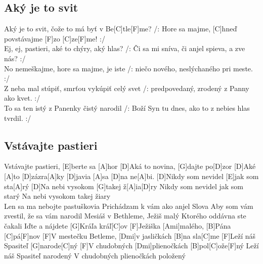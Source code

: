 \documentclass[10pt]{article}
\begin{document}
\begin{Large}
\begin{minipage}{\textwidth}
\subsection{Aký je to svit}
\begin{guitar}
	[F]Aký je to svit, čože to má byť v Be[C]tle[F]me?
	/: Hore sa majme, [C]hneď povstávajme [F]zo [C]ze[F]me! :/
	\\
	Ej, ej, pastieri, aké to chýry, aký hlas?
	/: Či sa mi sníva, či anjel spieva, a zve nás? :/
	\\
	No nemeškajme, hore sa majme, je iste
	/: niečo nového, neslýchaného pri meste. :/
	\\
	Z neba mal stúpiť, smrťou vykúpiť celý svet
	/: predpovedaný, zrodený z Panny ako kvet. :/
	\\
	To sa ten istý z Panenky čistý narodil
	/: Boží Syn tu dnes, ako to z nebies hlas tvrdil. :/
\end{guitar}
\end{minipage}

\begin{minipage}{\textwidth}
\subsection{Vstávajte pastieri}
\begin{multicols}{2}
\begin{guitar}
	[D]Vstávajte pastieri, [E]berte sa [A]hor
	[D]Aká to novina, [G]dajte po[D]zor
	[D]Aké [A]to [D]zázra[A]ky [D]javia [A]sa [D]na ne[A]bi.
	[D]Nikdy som nevidel [E]jak som sta[A]rý
	[D]Na nebi vysokom [G]takej ž[A]ia[D]ry
	Nikdy som nevidel jak som starý
	Na nebi vysokom takej žiary
	\\
	Len sa ma nebojte pastuškovia
	Prichádzam k vám ako anjel Slova
	Aby som vám zvestil, že sa vám narodil
	Mesiáš v Bethleme, Ježiš malý
	Ktorého oddávna ste čakali
	\columnbreak
	[F]Iďte a nájdete [G]Kráľa kráľ[C]ov
	[F]Ježiška [Ami]malého, [B]Pána [C]pá[F]nov
	[F]V mestečku Betleme, [Dmi]v jasličkách [B]na sla[C]me
	[F]Leží náš Spasiteľ [G]narode[C]ný
	[F]V chudobných [Dmi]plienočkách [B]pol[C]ože[F]ný
	Leží náš Spasiteľ narodený
	V chudobných plienočkách položený
\end{guitar}
\end{multicols}
\end{minipage}

\begin{minipage}{\textwidth}

\end{minipage}
\end{Large}
\end{document}
